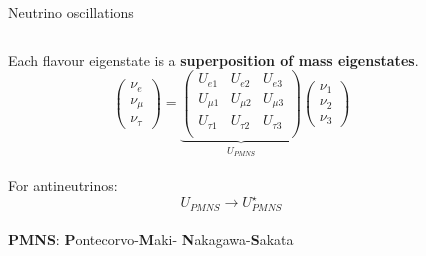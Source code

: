 %
%
%

\begin{frame}{Neutrino oscillations}

\begin{columns}
 \begin{column}{0.50\textwidth}
  Each flavour eigenstate is a {\bf superposition of mass eigenstates}.
  \begin{equation}
   \nonumber
   \begin{pmatrix}
    \nu_{e}\\ \nu_{\mu}\\ \nu_{\tau}
   \end{pmatrix}
   =
   \underbrace{
   \begin{pmatrix}
     U_{e1} & U_{e2} & U_{e3} \\
     U_{\mu1} & U_{\mu2} & U_{\mu3} \\
     U_{\tau1} & U_{\tau2} & U_{\tau3} \\
   \end{pmatrix}
   }_\text{$U_{PMNS}$}
   \begin{pmatrix}
    \nu_{1}\\ \nu_{2}\\ \nu_{3}
   \end{pmatrix}
  \end{equation}\\
  \vspace{0.3cm}
   For antineutrinos:
  \begin{equation}
   \nonumber
   U_{PMNS} \rightarrow U^{\star}_{PMNS}
  \end{equation}\\
  {\scriptsize \color{magenta} {\bf PMNS}: {\bf P}ontecorvo-{\bf M}aki-{\bf
      N}akagawa-{\bf S}akata}
 \end{column}
 \begin{column}{0.50\textwidth}
   \begin{center}
   \vspace{0.3cm}

\end{center}
\end{column}
\end{columns}
\end{frame}
